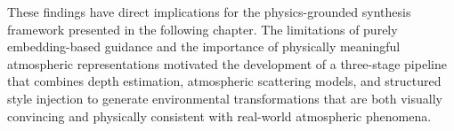 These findings have direct implications for the physics-grounded synthesis framework presented in the following chapter. The limitations of purely embedding-based guidance and the importance of physically meaningful atmospheric representations motivated the development of a three-stage pipeline that combines depth estimation, atmospheric scattering models, and structured style injection to generate environmental transformations that are both visually convincing and physically consistent with real-world atmospheric phenomena.
